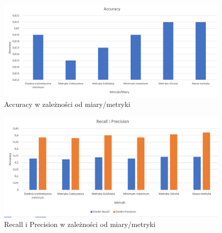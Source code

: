 \documentclass{classrep}
\begin{document}
{\begin{figure}[H]
\caption{Accuracy w zależności od miary/metryki}
\centering
\includegraphics[width=1\textwidth]{i5}
\end{figure}

\begin{figure}[H]
\caption{Recall i Precision w zależności od miary/metryki}
\centering
\includegraphics[width=1\textwidth]{i6}
\end{figure}

}
\end{document}
